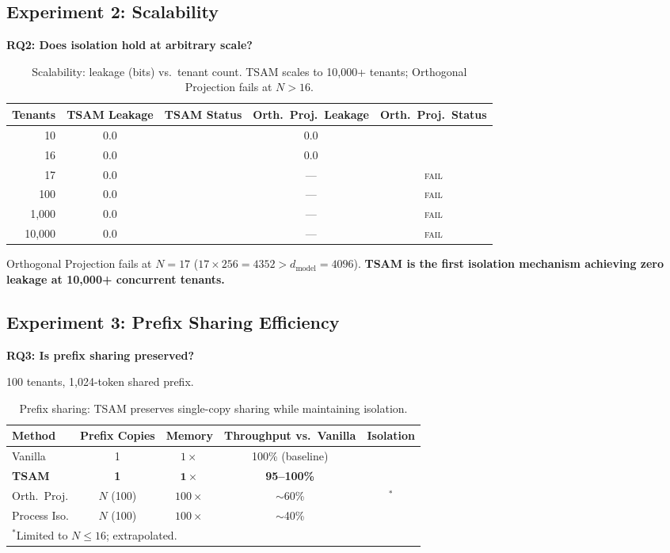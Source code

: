 \documentclass[11pt]{article}
\newcommand{\cmark}{\ding{51}}
\newcommand{\xmark}{\ding{55}}
\begin{document}
\subsection{Experiment 2: Scalability}

\textbf{RQ2: Does isolation hold at arbitrary scale?}

\begin{table}[t]
\centering
\caption{Scalability: leakage (bits) vs.\ tenant count. TSAM scales to 10,000+ tenants; Orthogonal Projection fails at $N > 16$.}
\label{tab:scalability}
\begin{tabular}{@{}rcccc@{}}
\toprule
\textbf{Tenants} & \textbf{TSAM Leakage} & \textbf{TSAM Status} & \textbf{Orth.\ Proj.\ Leakage} & \textbf{Orth.\ Proj.\ Status} \\
\midrule
10 & 0.0 & \cmark & 0.0 & \cmark \\
16 & 0.0 & \cmark & 0.0 & \cmark \\
17 & 0.0 & \cmark & --- & \textsc{fail} \\
100 & 0.0 & \cmark & --- & \textsc{fail} \\
1,000 & 0.0 & \cmark & --- & \textsc{fail} \\
10,000 & 0.0 & \cmark & --- & \textsc{fail} \\
\bottomrule
\end{tabular}
\end{table}

Orthogonal Projection fails at $N = 17$ ($17 \times 256 = 4352 > d_{\mathrm{model}} = 4096$). \textbf{TSAM is the first isolation mechanism achieving zero leakage at 10,000+ concurrent tenants.}

\subsection{Experiment 3: Prefix Sharing Efficiency}

\textbf{RQ3: Is prefix sharing preserved?}

100 tenants, 1,024-token shared prefix.

\begin{table}[t]
\centering
\caption{Prefix sharing: TSAM preserves single-copy sharing while maintaining isolation.}
\label{tab:prefix}
\begin{tabular}{@{}lcccc@{}}
\toprule
\textbf{Method} & \textbf{Prefix Copies} & \textbf{Memory} & \textbf{Throughput vs.\ Vanilla} & \textbf{Isolation} \\
\midrule
Vanilla & 1 & $1\times$ & 100\% (baseline) & \xmark \\
\textbf{TSAM} & \textbf{1} & $\mathbf{1\times}$ & \textbf{95--100\%} & \cmark \\
Orth.\ Proj. & $N$ (100) & $100\times$ & $\sim$60\% & \cmark$^*$ \\
Process Iso. & $N$ (100) & $100\times$ & $\sim$40\% & \cmark \\
\bottomrule
\multicolumn{5}{l}{\footnotesize $^*$Limited to $N \leq 16$; extrapolated.}
\end{tabular}
\end{table}
\end{document}
